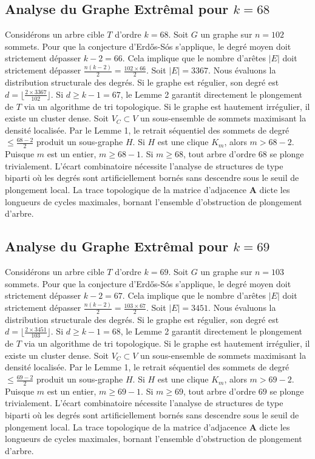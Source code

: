 \documentclass[11pt,a4paper]{article}
\begin{document}
\subsection{Analyse du Graphe Extr\^emal pour $k=68$}
Consid\'erons un arbre cible $T$ d'ordre $k=68$.
Soit $G$ un graphe sur $n=102$ sommets.
Pour que la conjecture d'Erd\H{o}s-S\'os s'applique, le degr\'e moyen doit strictement d\'epasser $k-2 = 66$.
Cela implique que le nombre d'ar\^etes $|E|$ doit strictement d\'epasser $\frac{n(k-2)}{2} = \frac{102 \times 66}{2}$.
Soit $|E| = 3367$.
Nous \'evaluons la distribution structurale des degr\'es. Si le graphe est r\'egulier, son degr\'e est $d = \lfloor \frac{2 \times 3367}{102} \rfloor$.
Si $d \geq k-1 = 67$, le Lemme 2 garantit directement le plongement de $T$ via un algorithme de tri topologique.
Si le graphe est hautement irr\'egulier, il existe un cluster dense. Soit $V_C \subset V$ un sous-ensemble de sommets maximisant la densit\'e localis\'ee.
Par le Lemme 1, le retrait s\'equentiel des sommets de degr\'e $\leq \frac{68-2}{2}$ produit un sous-graphe $H$.
Si $H$ est une clique $K_{m}$, alors $m > 68-2$. Puisque $m$ est un entier, $m \geq 68-1$. Si $m \geq 68$, tout arbre d'ordre $68$ se plonge trivialement.
L'\'ecart combinatoire n\'ecessite l'analyse de structures de type biparti o\`u les degr\'es sont artificiellement born\'es sans descendre sous le seuil de plongement local. La trace topologique de la matrice d'adjacence $\mathbf{A}$ dicte les longueurs de cycles maximales, bornant l'ensemble d'obstruction de plongement d'arbre.


\subsection{Analyse du Graphe Extr\^emal pour $k=69$}
Consid\'erons un arbre cible $T$ d'ordre $k=69$.
Soit $G$ un graphe sur $n=103$ sommets.
Pour que la conjecture d'Erd\H{o}s-S\'os s'applique, le degr\'e moyen doit strictement d\'epasser $k-2 = 67$.
Cela implique que le nombre d'ar\^etes $|E|$ doit strictement d\'epasser $\frac{n(k-2)}{2} = \frac{103 \times 67}{2}$.
Soit $|E| = 3451$.
Nous \'evaluons la distribution structurale des degr\'es. Si le graphe est r\'egulier, son degr\'e est $d = \lfloor \frac{2 \times 3451}{103} \rfloor$.
Si $d \geq k-1 = 68$, le Lemme 2 garantit directement le plongement de $T$ via un algorithme de tri topologique.
Si le graphe est hautement irr\'egulier, il existe un cluster dense. Soit $V_C \subset V$ un sous-ensemble de sommets maximisant la densit\'e localis\'ee.
Par le Lemme 1, le retrait s\'equentiel des sommets de degr\'e $\leq \frac{69-2}{2}$ produit un sous-graphe $H$.
Si $H$ est une clique $K_{m}$, alors $m > 69-2$. Puisque $m$ est un entier, $m \geq 69-1$. Si $m \geq 69$, tout arbre d'ordre $69$ se plonge trivialement.
L'\'ecart combinatoire n\'ecessite l'analyse de structures de type biparti o\`u les degr\'es sont artificiellement born\'es sans descendre sous le seuil de plongement local. La trace topologique de la matrice d'adjacence $\mathbf{A}$ dicte les longueurs de cycles maximales, bornant l'ensemble d'obstruction de plongement d'arbre.
\end{document}
